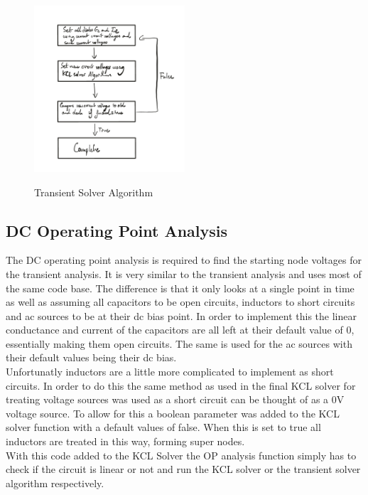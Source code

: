\documentclass{article}
\begin{document}
\begin{figure}[h]
    \caption{Transient Solver Algorithm}
    \centering
    \includegraphics[width=0.5\textwidth]{images/TransientSolverAlgorithm.png}
    \label{fig:transient}
\end{figure}

\newpage

\subsection{DC Operating Point Analysis}
The DC operating point analysis is required to find the starting node voltages for the transient analysis. It is very similar to the transient analysis and uses most of the same code base. The difference is that it only looks at a single point in time as well as assuming all capacitors to be open circuits, inductors to short circuits and ac sources to be at their dc bias point. In order to implement this the linear conductance and current of the capacitors are all left at their default value of 0, essentially making them open circuits. The same is used for the ac sources with their default values being their dc bias.\\Unfortunatly inductors are a little more complicated to implement as short circuits. In order to do this the same method as used in the final KCL solver for treating voltage sources was used as a short circuit can be thought of as a 0V voltage source. To allow for this a boolean parameter was added to the KCL solver function with a default values of false. When this is set to true all inductors are treated in this way, forming super nodes.\\
With this code added to the KCL Solver the OP analysis function simply has to check if the circuit is linear or not and run the KCL solver or the transient solver algorithm respectively. 
\newpage
\end{document}
